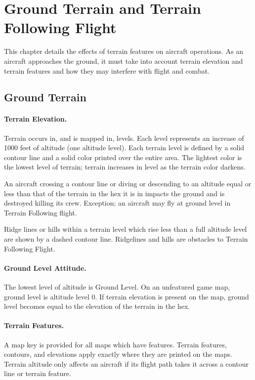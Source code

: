 \section{Ground Terrain and Terrain Following Flight}

This chapter details the effects of terrain features on aircraft operations. As an aircraft approaches the ground, it must take into account terrain elevation and terrain features and how they may interfere with flight and combat.

\subsection{Ground Terrain}

\paragraph{Terrain Elevation.} Terrain occurs in, and is mapped in, levels. Each level represents an increase of 1000 feet of altitude (one altitude level). Each terrain level is defined by a solid contour line and a solid color printed over the entire area. The lightest color is the lowest level of terrain; terrain increases in level as the terrain color darkens.

An aircraft crossing a contour line or diving or descending to an altitude equal or less than that of the terrain in the hex it is in impacts the ground and is destroyed killing its crew. Exception; an aircraft may fly at ground level in Terrain Following flight.

Ridge lines or hills within a terrain level which rise less than a full altitude level are shown by a dashed contour line. Ridgelines and hills are obstacles to Terrain Following Flight.

\paragraph{Ground Level Attitude.} The lowest level of altitude is Ground Level. On an unfeatured game map, ground level is altitude level 0. If terrain elevation is present on the map, ground level becomes equal to the elevation of the terrain in the hex.

\paragraph{Terrain Features.} A map key is provided for all maps which have features. Terrain features, contours, and elevations apply exactly where they are printed on the maps. Terrain altitude only affects an aircraft if its flight path takes it across a contour line or terrain feature.

